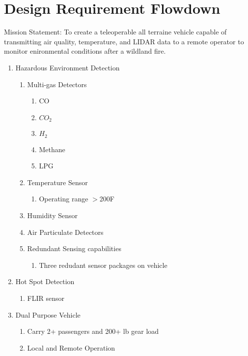 \chapter{Design Requirement Flowdown} \label{App:DesignRequirements}
Mission Statement: To create a teleoperable all terraine vehicle capable of transmitting air quality, temperature, and LIDAR data to a remote operator to monitor enironmental conditions after a wildland fire.
    \begin{enumerate}
    	\item Hazardous Environment Detection
        \begin{enumerate}
        	\item Multi-gas Detectors
           	\begin{enumerate}
            	\item CO
                \item $CO_2$
                \item $H_2$
                \item Methane
                \item LPG
            \end{enumerate}
            \item Temperature Sensor
            \begin{enumerate}
				\item Operating range $>$200\degree F
            \end{enumerate}
            \item Humidity Sensor
			\item Air Particulate Detectors
            \item Redundant Sensing capabilities
            \begin{enumerate}
        		\item Three redudant sensor packages on vehicle
        	\end{enumerate}
        \end{enumerate}
        \item Hot Spot Detection
        \begin{enumerate}
        	\item FLIR sensor
        \end{enumerate}
        \item Dual Purpose Vehicle
        \begin{enumerate}
        	\item Carry 2+ passengers and 200+ lb gear load
            \item Local and Remote Operation

\end{enumerate}
\end{enumerate}
